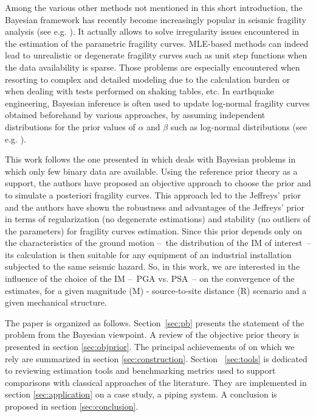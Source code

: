 Among the various other methods not mentioned in this short introduction, the Bayesian framework has recently become increasingly popular in seismic fragility analysis (see e.g. \cite{Gardoni2002, WANG2018232, Katayama2021, KOUTSOURELAKIS2010, damblin2014, TADINADA201749, KWAG20181,Jeon2019,TABANDEH2020}). 
It actually allows to solve irregularity issues encountered in the estimation of the parametric fragility curves. MLE-based methods can indeed lead to unrealistic or degenerate fragility curves such as unit step functions when the data availability is sparse. Those problems are especially encountered when resorting to complex and detailed modeling due to the calculation burden or when dealing with tests performed on shaking tables, etc. In earthquake engineering, Bayesian inference is often used to update log-normal fragility curves obtained beforehand by various approaches, by assuming independent distributions for the prior values of $\alpha$ and $\beta$ such as log-normal distributions (see e.g. \cite{TADINADA201749, KWAG20181, WANG2018232, Katayama2021, Straub2008}).

This work follows the one presented in \cite{AVB2023} which deals with Bayesian problems in which only few binary data are available. Using the reference prior theory as a support, the authors have proposed an objective approach to choose the prior and to simulate a posteriori fragility curves. This approach led to the Jeffreys' prior and the authors have shown the robustness and advantages of the Jeffreys' prior in terms of regularization (no degenerate estimations) and stability (no outliers of the parameters) for fragility curves estimation. Since this prior depends only on the characteristics of the ground motion --~the distribution of the IM of interest~-- its calculation is then suitable for any equipment of an industrial installation subjected to the same seismic hazard. So, in this work, we are interested in the influence of the choice of the IM --~PGA vs. PSA~-- on the convergence of the estimates, for a given magnitude (M) - source-to-site distance (R) scenario and a given mechanical structure.

The paper is organized as follows. Section~\ref{sec:pb} presents the statement of the problem from the Bayesian viewpoint. A review of the objective prior theory is presented in section \ref{sec:objprior}. The principal achievements of \cite{AVB2023} on which we rely are summarized in section \ref{sec:construction}. Section ~\ref{sec:tools} is dedicated to reviewing estimation tools and benchmarking metrics used to support comparisons with classical approaches of the literature. They are implemented in section \ref{sec:application} on a case study, a piping system. A conclusion is proposed in section \ref{sec:conclusion}.





